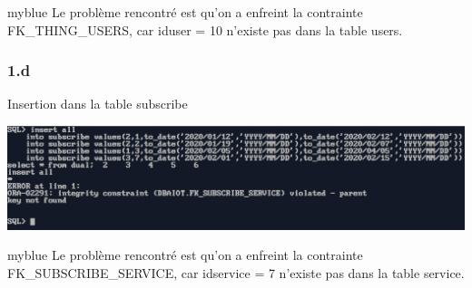 \begin{prettyBox}{}{myblue}
Le problème rencontré est qu'on a enfreint la contrainte FK\_THING\_USERS, car iduser = 10 n'existe pas dans la table users.
\end{prettyBox}

\vspace{0.25cm}
\subsubsection*{1.d}
Insertion dans la table subscribe



\begin{center}
    \includegraphics[width=\textwidth]{ScreenShot/Partie3/sub.png}
\end{center}

\begin{prettyBox}{}{myblue}
Le problème rencontré est qu'on a enfreint la contrainte FK\_SUBSCRIBE\_SERVICE, car idservice = 7 n'existe pas dans la table service.
\end{prettyBox}



